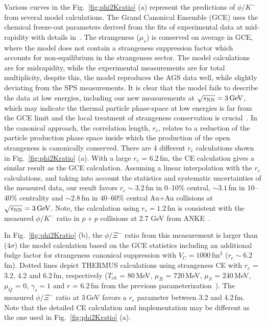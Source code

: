 \documentclass[%
 reprint,	
showpacs,
 amsmath,amssymb,
 aps,
 prc,
]{revtex4-1}
\begin{document}
Various curves in the Fig.~\ref{fig:phi2Kratio} (a) represent the predictions of $\phi/K^-$ from several model calculations. The Grand Canonical Ensemble (GCE) uses the chemical freeze-out parameters derived from the fits of experimental data at mid-rapidity with details in~\cite{ANDRONIC2006167_SHM}. The strangeness ($\mu_s$) is conserved on average in GCE, where the model does not contain a strangeness suppression factor which accounts for non-equilibrium in the strangeness sector. The model calculations are for midrapidity, while the experimental measurements are for total multiplicity, despite this, the model reproduces the AGS data well, while slightly deviating from the SPS measurements. It is clear that the model fails to describe the data at low energies, including our new measurements at ${\sqrt{s_{\rm NN}} = \rm{3\,GeV}}$, which may indicate the thermal particle phase-space at low energies is far from the GCE limit and the local treatment of strangeness conservation is crucial~\cite{BraunMunzinger:2003zd}. In the canonical approach, the correlation length, $r_c$, relates to a reduction of the particle production phase space inside which the production of the open strangeness is canonically conserved. There are 4 different $r_c$ calculations shown in Fig.~\ref{fig:phi2Kratio} (a). With a large $r_c$ = 6.2\,fm, the CE calculation gives a similar result as the GCE calculation. Assuming a linear interpolation with the $r_c$ calculations, and taking into account the statistics and systematic uncertainties of the measured data, %
our result favors $r_c \sim 3.2$\,fm in 0--10\% central, $\sim 3.1$\,fm in 10--40\% centrality and $\sim 2.8$\,fm in 40--60\% central Au+Au collisions at ${\sqrt{s_{\rm NN}} = \rm{3\,GeV}}$.
Note, the calculation using $r_c = 1.2$\,fm is consistent with the measured $\phi/K^-$ ratio in $p+p$ collisions at 2.7 GeV from ANKE~\cite{ANKE_phi,HADES_phi_ArKCl}. 

In Fig.~\ref{fig:phi2Kratio} (b), the $\phi/\Xi^-$ ratio from this measurement is larger than ($4\sigma$) the model calculation based on the GCE statistics including an additional fudge factor for strangeness canonical suppression with $V_C=1000$\,fm$^3$ ($r_c\sim6.2$\,fm). Dotted lines depict THERMUS calculations using strangeness CE with $r_c$ = 3.2, 4.2 and 6.2\,fm, respectively ($T_{ch}$ = 80\,MeV, $\mu_B$ = 720\,MeV, $\mu_S$ = 240\,MeV, $\mu_Q$ = 0, $\gamma_s = 1$ and $r$ = 6.2\,fm from the previous parameterization~\cite{CE_Cleymans}). The measured $\phi/\Xi^-$ ratio at 3\,GeV favors a $r_c$ parameter between 3.2 and 4.2\,fm. 
Note that the detailed CE calculation and implementation may be different as the one used in Fig.~\ref{fig:phi2Kratio} (a).  
\end{document}
